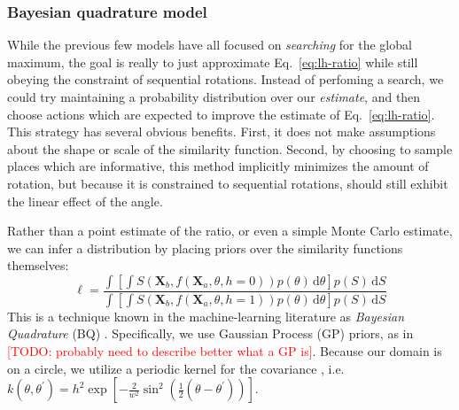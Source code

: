 \documentclass[10pt,letterpaper]{article}
\newcommand{\TODO}[1]{\textcolor{red}{[TODO: #1]}}
\newcommand{\Xa}[0]{\mathbf{X}_a}
\newcommand{\Xb}[0]{\mathbf{X}_b}
\newcommand{\hi}[0]{h=0}
\newcommand{\hf}[0]{h=1}
\newcommand{\dif}[0]{\,\mathrm{d}}
\begin{document}
\subsubsection{Bayesian quadrature model}

While the previous few models have all focused on \textit{searching}
for the global maximum, the goal is really to just approximate
Eq.~\ref{eq:lh-ratio} while still obeying the constraint of sequential
rotations. Instead of perfoming a search, we could try maintaining a
probability distribution over our \textit{estimate}, and then choose
actions which are expected to improve the estimate of
Eq.~\ref{eq:lh-ratio}. This strategy has several obvious
benefits. First, it does not make assumptions about the shape or scale
of the similarity function. Second, by choosing to sample places which
are informative, this method implicitly minimizes the amount of
rotation, but because it is constrained to sequential rotations,
should still exhibit the linear effect of the angle.

Rather than a point estimate of the ratio, or even a simple
Monte Carlo estimate, we can infer a distribution by placing priors
over the similarity functions themselves:
\begin{equation}
\ell = \frac{\int \left[\int S(\Xb, f(\Xa, \theta, \hi))p(\theta)\dif\theta\right] p(S)\dif S}{\int \left[\int S(\Xb, f(\Xa, \theta, \hf))p(\theta)\dif\theta\right] p(S)\dif S}
\end{equation}
This is a technique known in the machine-learning literature as
\textit{Bayesian Quadrature} (BQ)
\cite{Diaconis:1988uo,OHagan:1991tx,Osborne:2012tm}. Specifically, we
use Gaussian Process (GP) priors, as in 
\TODO{probably need to describe better what a GP is}. Because our
domain is on a circle, we utilize a periodic kernel for the covariance
\cite{Rasmussen:2006vz}, i.e. $k(\theta,
\theta^\prime)=h^2\exp[-\frac{2}{w^2}\sin^2(\frac{1}{2}(\theta-\theta^\prime))]$.
\end{document}
